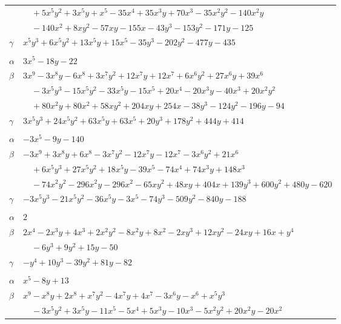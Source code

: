 \documentclass[11pt]{article}
\begin{document}
\begin{longtable}{@{}ll@{}}
 & $\quad +5x^{5}y^{2}+3x^{5}y+x^{5}-35x^{4}+35x^{3}y+70x^{3}-35x^{2}y^{2}-140x^{2}y$\\
 & $\quad -140x^{2}+8xy^{2}-57xy-155x-43y^{3}-153y^{2}-171y-125$\\
$\gamma$ & $x^{5}y^{3}+6x^{5}y^{2}+13x^{5}y+15x^{5}-35y^{3}-202y^{2}-477y-435$\\
\addlinespace[3pt]
\multicolumn{2}{@{}l}{$\{i,j\}=\{14,24\}$, $k_{ij}=2^{2}\cdot 5^{2}$}\\
$\alpha$ & $3x^{5}-18y-22$\\
$\beta$ & $3x^{9}-3x^{8}y-6x^{8}+3x^{7}y^{2}+12x^{7}y+12x^{7}+6x^{6}y^{2}+27x^{6}y+39x^{6}$\\
 & $\quad -3x^{5}y^{3}-15x^{5}y^{2}-33x^{5}y-15x^{5}+20x^{4}-20x^{3}y-40x^{3}+20x^{2}y^{2}$\\
 & $\quad +80x^{2}y+80x^{2}+58xy^{2}+204xy+254x-38y^{3}-124y^{2}-196y-94$\\
$\gamma$ & $3x^{5}y^{3}+24x^{5}y^{2}+63x^{5}y+63x^{5}+20y^{3}+178y^{2}+444y+414$\\
\addlinespace[3pt]
\multicolumn{2}{@{}l}{$\{i,j\}=\{14,33\}$, $k_{ij}=2^{3}\cdot 5\cdot 17$}\\
$\alpha$ & $-3x^{5}-9y-140$\\
$\beta$ & $-3x^{9}+3x^{8}y+6x^{8}-3x^{7}y^{2}-12x^{7}y-12x^{7}-3x^{6}y^{2}+21x^{6}$\\
 & $\quad +6x^{5}y^{3}+27x^{5}y^{2}+18x^{5}y-39x^{5}-74x^{4}+74x^{3}y+148x^{3}$\\
 & $\quad -74x^{2}y^{2}-296x^{2}y-296x^{2}-65xy^{2}+48xy+404x+139y^{3}+600y^{2}+480y-620$\\
$\gamma$ & $-3x^{5}y^{3}-21x^{5}y^{2}-36x^{5}y-3x^{5}-74y^{3}-509y^{2}-840y-188$\\
\addlinespace[3pt]
\multicolumn{2}{@{}l}{$\{i,j\}=\{15,16\}$, $k_{ij}=2^{3}\cdot 3^{2}$}\\
$\alpha$ & $2$\\
$\beta$ & $2x^{4}-2x^{3}y+4x^{3}+2x^{2}y^{2}-8x^{2}y+8x^{2}-2xy^{3}+12xy^{2}-24xy+16x+y^{4}$\\
 & $\quad -6y^{3}+9y^{2}+15y-50$\\
$\gamma$ & $-y^{4}+10y^{3}-39y^{2}+81y-82$\\
\addlinespace[3pt]
\multicolumn{2}{@{}l}{$\{i,j\}=\{15,22\}$, $k_{ij}=2\cdot 3^{2}\cdot 11$}\\
$\alpha$ & $x^{5}-8y+13$\\
$\beta$ & $x^{9}-x^{8}y+2x^{8}+x^{7}y^{2}-4x^{7}y+4x^{7}-3x^{6}y-x^{6}+x^{5}y^{3}$\\
 & $\quad -3x^{5}y^{2}+3x^{5}y-11x^{5}-5x^{4}+5x^{3}y-10x^{3}-5x^{2}y^{2}+20x^{2}y-20x^{2}$\\

\end{longtable}
\end{document}
